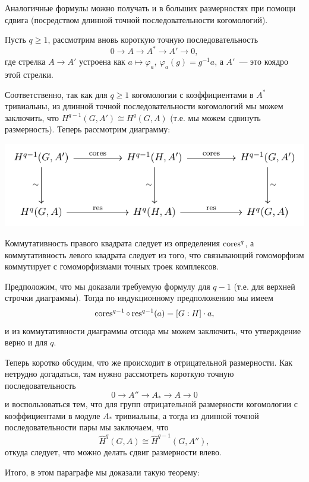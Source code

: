 	 Аналогичные формулы можно получать и в больших размерностях при помощи сдвига (посредством длинной точной последовательности когомологий). 

	 Пусть $q \ge 1$, рассмотрим вновь короткую точную последовательность 
	 \[
	 	0 \to A \to A^* \to A' \to 0,
	 \]
	 где стрелка $A \to A'$ устроена как $a \mapsto \varphi_a, \ \varphi_a(g) = g^{-1}a$, а $A'$~--- это коядро этой стрелки. 

	 Соответственно, так как для $q \ge 1$ когомологии с коэффициентами в $A^*$ тривиальны, из длинной точной последовательности когомологий мы можем заключить, что $H^{q - 1}(G, A') \cong H^{q}(G, A)$ (т.е. мы можем сдвинуть размерность). Теперь рассмотрим диаграмму: 

	 \begin{center}
	 	\includegraphics{lectures/6/pictures/cd_19.pdf}
	 \end{center}

	 Коммутативность правого квадрата следует из определения $\operatorname{cores}^q$, а коммутативность левого квадрата следует из того, что связывающий гомоморфизм коммутирует с гомоморфизмами точных троек комплексов. 

	 Предположим, что мы доказали требуемую формулу для $q - 1$ (т.е. для верхней строчки диаграммы). Тогда по индукционному предположению мы имеем 
	 \[
	 	\operatorname{cores}^{q - 1} \circ \operatorname{res}^{q - 1}(a) = [G : H] \cdot a,
	 \]
	 и из коммутативности диаграммы отсюда мы можем заключить, что утверждение верно и для $q$. 


	 Теперь коротко обсудим, что же происходит в отрицательной размерности. Как нетрудно догадаться, там нужно рассмотреть короткую точную последовательность 
	 \[
	 	0 \to A'' \to A_* \to A \to 0
	 \]
	 и воспользоваться тем, что для групп отрицательной размерности когомологии с коэффициентами в модуле $A_*$ тривиальны, а тогда из длинной точной последовательности пары мы заключаем, что 
	 \[
	 	\widehat{H}^q(G, A) \cong \widehat{H}^{q - 1}(G, A''),
	 \]
	 откуда следует, что можно делать сдвиг размерности влево. 

	 Итого, в этом параграфе мы доказали такую теорему: 


